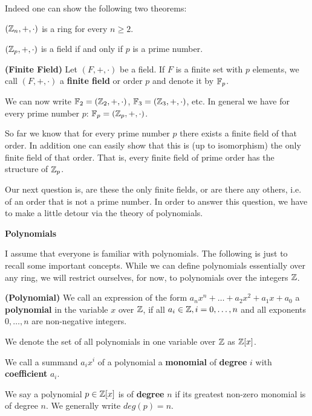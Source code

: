 Indeed one can show the following two theorems:
\begin{theorem}{}
  $(\mathbb{Z}_n,+,\cdot)$ is a ring for every $n\geq 2$.
\end{theorem}
\begin{theorem}{}
  $(\mathbb{Z}_p,+,\cdot)$ is a field if and only if $p$ is a prime number.
\end{theorem}

\begin{definition}{\textbf{(Finite Field)}}
  Let $(F,+,\cdot)$ be a field. If $F$ is a finite set with $p$ elements, we
  call $(F,+,\cdot)$ a \textbf{finite field} or order $p$ and denote it by
  $\mathbb{F}_p$.
\end{definition}
\example We can now write $\mathbb{F}_2=(\mathbb{Z}_2,+,\cdot)$, $\mathbb{F}_3=(\mathbb{Z}_3,+,\cdot)$, etc. In
general we have for every prime number $p$: $\mathbb{F}_p=(\mathbb{Z}_p,+,\cdot)$.

So far we know that for every prime number $p$ there exists a finite field of
that order. In addition one can easily show that this is (up to isomorphism) the
only finite field of that order. That is, every finite field of prime order has
the structure of $\mathbb{Z}_p$.

Our next question is, are these the only finite fields, or are there any others,
i.e. of an order that is not a prime number. In order to answer this question,
we have to make a little detour via the theory of polynomials.

\pagebreak

\textbf{\large Polynomials}

I assume that everyone is familiar with polynomials. The following is just to
recall some important concepts. While we can define polynomials essentially over
any ring, we will restrict ourselves, for now, to polynomials over the integers
$\mathbb{Z}$.

\begin{definition}{\textbf{(Polynomial)}}
  We call an expression of the form $a_nx^n+\ldots+a_2x^2+a_1x+a_0$ a \textbf{polynomial}
  in the variable $x$ over $\mathbb{Z}$, if all $a_i\in\mathbb{Z}, i=0,\ldots,n$ and all
  exponents $0,\ldots,n$ are non-negative integers. 
  
  We denote the set of all polynomials in one variable over $\mathbb{Z}$ as $\mathbb{Z}[x]$.
  
  We call a summand $a_ix^i$ of a polynomial a \textbf{monomial} of
  \textbf{degree} $i$ with \textbf{coefficient} $a_i$. 
  
  We say a polynomial $p\in\mathbb{Z}[x]$ is of \textbf{degree} $n$ if its greatest
  non-zero monomial is of degree $n$. We generally write $deg(p)=n$.

\end{definition}

